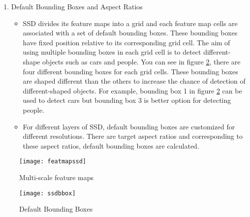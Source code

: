 \documentclass{article}
\begin{document}
\begin{enumerate}
    \item Default Bounding Boxes and Aspect Ratios
    \begin{itemize}
        \item SSD divides its feature maps into a grid and each feature map cells are 
associated with a set of default bounding boxes. These bounding boxes have fixed position 
relative to its corresponding grid cell. The aim of using multiple bounding boxes 
in each grid cell is to detect different-shape objects such as cars and people. You can see in 
figure \ref{fig:ssdbbox1}, there are four different bounding boxes for each grid cells. These bounding 
boxes are shaped different than the others to increase the chance of detection of different-shaped 
objects. For example, bounding box 1 in figure \ref{fig:ssdbbox1} can be used to detect cars but 
bounding box 3 is better option for detecting people.
        \item For different layers of SSD, default bounding boxes are customized for 
different resolutions. There are target aspect ratios and corresponding to these 
aspect ratios, default bounding boxes are calculated.
    \end{itemize}
\end{enumerate}

\begin{figure}
    \centering
    \texttt{[image: featmapssd]}
    \caption{Multi-scale feature maps}
    \label{fig:featmapssd1}
\end{figure}

\begin{figure}
    \centering
    \texttt{[image: ssdbbox]}
    \caption{Default Bounding Boxes}
    \label{fig:ssdbbox1}
\end{figure}
\end{document}
